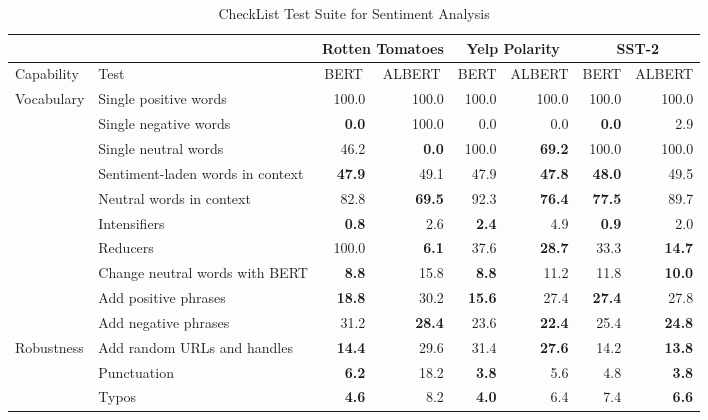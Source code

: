 \documentclass{article}
\begin{document}
\begin{table}[!htbp]
\centering
\begin{threeparttable}[b]
\caption{CheckList Test Suite for Sentiment Analysis}
\begin{tabular}{llrrrrrr}
\hline
 &
  \multicolumn{1}{r}{} &
  \multicolumn{2}{c}{Rotten Tomatoes} &
  \multicolumn{2}{c}{Yelp Polarity} &
  \multicolumn{2}{c}{SST-2} \\ \hline
Capability &
  Test &
  \multicolumn{1}{c}{BERT} &
  \multicolumn{1}{c}{ALBERT} &
  \multicolumn{1}{c}{BERT} &
  \multicolumn{1}{c}{ALBERT} &
  \multicolumn{1}{c}{BERT} &
  \multicolumn{1}{c}{ALBERT} \\ \hline
\multirow{10}{*}{Vocabulary} &
  Single positive words &
  100.0 &
  100.0 &
  100.0 &
  100.0 &
  100.0 &
  100.0 \\
 &
  Single negative words &
  \textbf{0.0} &
  100.0 &
  0.0 &
  0.0 &
  \textbf{0.0} &
  2.9 \\
 &
  Single neutral words &
  46.2 &
  \textbf{0.0} &
  100.0 &
  \textbf{69.2} &
  100.0 &
  100.0 \\
 &
  Sentiment-laden words in context &
  \textbf{47.9} &
  49.1 &
  47.9 &
  \textbf{47.8} &
  \textbf{48.0} &
  49.5 \\
 &
  Neutral words in context &
  82.8 &
  \textbf{69.5} &
  92.3 &
  \textbf{76.4} &
  \textbf{77.5} &
  89.7 \\
 &
  Intensifiers &
  \textbf{0.8} &
  2.6 &
  \textbf{2.4} &
  4.9 &
  \textbf{0.9} &
  2.0 \\
 &
  Reducers &
  100.0 &
  \textbf{6.1} &
  37.6 &
  \textbf{28.7} &
  33.3 &
  \textbf{14.7} \\
 &
  Change neutral words with BERT &
  \textbf{8.8} &
  15.8 &
  \textbf{8.8} &
  11.2 &
  11.8 &
  \textbf{10.0} \\
 &
  Add positive phrases &
  \textbf{18.8} &
  30.2 &
  \textbf{15.6} &
  27.4 &
  \textbf{27.4} &
  27.8 \\
 &
  Add negative phrases &
  31.2 &
  \textbf{28.4} &
  23.6 &
  \textbf{22.4} &
  25.4 &
  \textbf{24.8} \\ \hline
\multirow{5}{*}{Robustness} &
  Add random URLs and handles &
  \textbf{14.4} &
  29.6 &
  31.4 &
  \textbf{27.6} &
  14.2 &
  \textbf{13.8} \\
 &
  Punctuation &
  \textbf{6.2} &
  18.2 &
  \textbf{3.8} &
  5.6 &
  4.8 &
  \textbf{3.8} \\
 &
  Typos &
  \textbf{4.6} &
  8.2 &
  \textbf{4.0} &
  6.4 &
  7.4 &
  \textbf{6.6} \\

\end{tabular}
\end{threeparttable}
\end{table}
\end{document}
